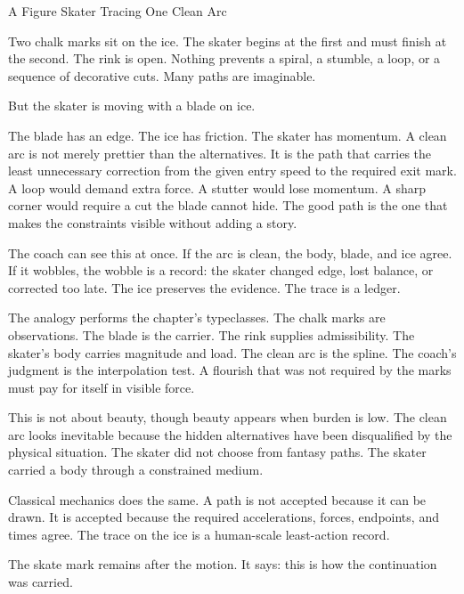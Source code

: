 \begin{coda}{A Figure Skater Tracing One Clean Arc}

Two chalk marks sit on the ice. The skater begins at the first and must finish
at the second. The rink is open. Nothing prevents a spiral, a stumble, a loop,
or a sequence of decorative cuts. Many paths are imaginable.

But the skater is moving with a blade on ice.

The blade has an edge. The ice has friction. The skater has momentum. A clean
arc is not merely prettier than the alternatives. It is the path that carries
the least unnecessary correction from the given entry speed to the required
exit mark. A loop would demand extra force. A stutter would lose momentum. A
sharp corner would require a cut the blade cannot hide. The good path is the
one that makes the constraints visible without adding a story.

The coach can see this at once. If the arc is clean, the body, blade, and ice
agree. If it wobbles, the wobble is a record: the skater changed edge, lost
balance, or corrected too late. The ice preserves the evidence. The trace is a
ledger.

The analogy performs the chapter's typeclasses. The chalk marks are
observations. The blade is the carrier. The rink supplies admissibility. The
skater's body carries magnitude and load. The clean arc is the spline. The
coach's judgment is the interpolation test. A flourish that was not required by
the marks must pay for itself in visible force.

This is not about beauty, though beauty appears when burden is low. The clean
arc looks inevitable because the hidden alternatives have been disqualified by
the physical situation. The skater did not choose from fantasy paths. The
skater carried a body through a constrained medium.

Classical mechanics does the same. A path is not accepted because it can be
drawn. It is accepted because the required accelerations, forces, endpoints,
and times agree. The trace on the ice is a human-scale least-action record.

The skate mark remains after the motion. It says: this is how the continuation
was carried.

\end{coda}
